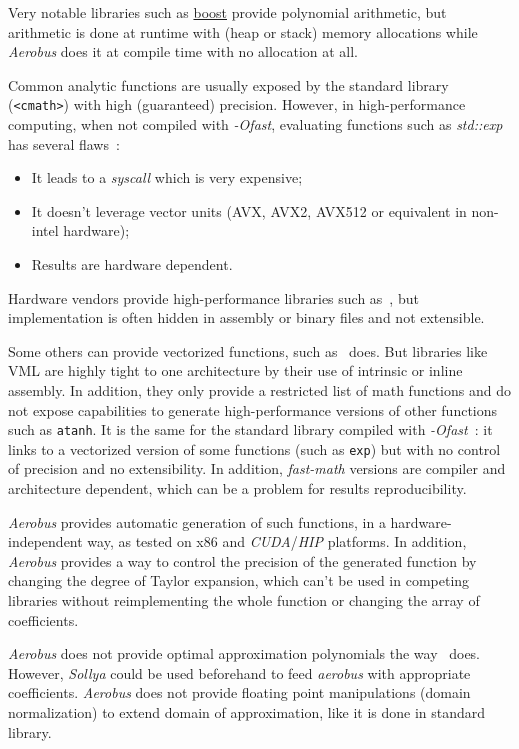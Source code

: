 \documentclass[twocolumn, switch]{article}
\begin{document}
Very notable libraries such as \href{https://live.boost.org/doc/libs/1_86_0/libs/math/doc/html/math_toolkit/polynomials.html}{boost} provide polynomial arithmetic, but arithmetic is done at runtime with (heap or stack) memory allocations while \textit{Aerobus} does it at compile time with no allocation at all.

Common analytic functions are usually exposed by the standard library (\lstinline{<cmath>}) with high (guaranteed) precision. However, in high-performance computing, when not compiled with \textit{-Ofast}, evaluating functions such as \textit{std::exp} has several flaws~:
\begin{itemize}
\item It leads to a \textit{syscall} which is very expensive;
\item It doesn't le\-ve\-ra\-ge vector units (AVX, AVX2, AVX512 or equivalent in non-intel hardware);
\item Results are hardware dependent.
\end{itemize}

Hardware vendors provide high-performance libraries such as~\cite{wang2014intel}, but implementation is often hidden in assembly or binary files and not extensible.

Some others can provide vectorized functions, such as~\cite{wang2014intel} does. But libraries like VML are highly tight to one architecture by their use of intrinsic or inline assembly. In addition, they only provide a restricted list of math functions and do not expose capabilities to generate high-performance versions of other functions such as \lstinline{atanh}. It is the same for the standard library compiled with \textit{-Ofast}~: it links to a vectorized version of some functions (such as \lstinline{exp}) but with no control of precision and no extensibility. In addition, \textit{fast-math} versions are compiler and architecture dependent, which can be a problem for results reproducibility.

\textit{Aerobus} provides automatic generation of such functions, in a hardware-independent way, as tested on x86 and \textit{CUDA}/\textit{HIP} platforms. In addition, \textit{Aerobus} provides a way to control the precision of the generated function by changing the degree of Taylor expansion, which can't be used in competing libraries without reimplementing the whole function or changing the array of coefficients.

\textit{Aerobus} does not provide optimal approximation polynomials the way~\cite{ChevillardJoldesLauter2010} does. However, \textit{Sollya} could be used beforehand to feed \textit{aerobus} with appropriate coefficients. \textit{Aerobus} does not provide floating point manipulations (domain normalization) to extend domain of approximation, like it is done in standard library.
\end{document}
